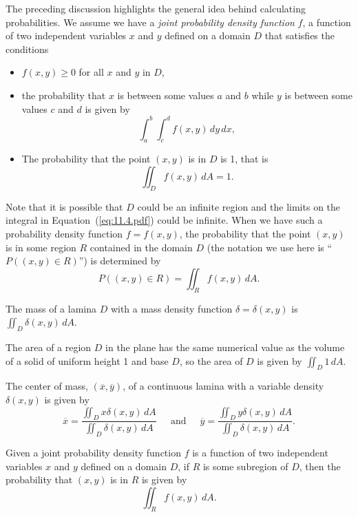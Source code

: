 The preceding discussion highlights the general idea behind calculating probabilities. We assume we have a \emph{joint probability density function} $f$, a function of two independent variables $x$ and $y$ defined on a domain $D$ that satisfies the conditions
\begin{itemize}
\item $f(x,y) \geq 0$ for all $x$ and $y$ in $D$,
\item the probability that $x$ is between some values $a$ and $b$ while $y$ is between some values $c$ and $d$ is given by
\[\int_a^b \int_c^d f(x,y) \, dy \, dx,\]
\item The probability that the point $(x,y)$ is in $D$ is 1, that is
\begin{equation} \label{eq:11.4.pdf}
\iint_D f(x,y) \, dA = 1.
\end{equation}
\end{itemize}
Note that it is possible that $D$ could be an infinite region and the limits on the integral in Equation~(\ref{eq:11.4.pdf}) could be infinite. When we have such a probability density function $f=f(x,y)$, the probability that the point $(x,y)$ is in some region $R$ contained in the domain $D$ (the notation we use here is ``$P((x,y)\in R)$'') is determined by
\[P((x,y)\in R) = \iint_R f(x,y) \, dA.\]



%

\begin{summary}
\item The mass of a lamina $D$ with a mass density function $\delta = \delta(x,y)$ is  $\iint_D \delta(x,y) \, dA.$

\item The area of a region $D$ in the plane has the same numerical value as the volume of a solid of uniform height 1 and base $D$, so the area of $D$ is given by $\iint_D 1 \, dA.$   
    
\item The center of mass, $(\overline{x},\overline{y})$, of a continuous lamina with a variable density $\delta(x,y)$ is given by \[\overline{x} = \frac{\iint_D x\delta(x,y) \, dA}{\iint_D \delta(x,y) \, dA} \ \ \ \ \ \text{ and } \ \ \ \ \ \overline{y} = \frac{\iint_D y\delta(x,y) \, dA}{\iint_D \delta(x,y) \, dA}.\]

\item Given a joint probability density function $f$ is a function of two independent variables $x$ and $y$ defined on a domain $D$, 
if $R$ is some subregion of $D$, then the probability that $(x,y)$ is in $R$ is given by
\[\iint_R f(x,y) \, dA.\]
\end{summary}

\nin \hrulefill



\clearpage

